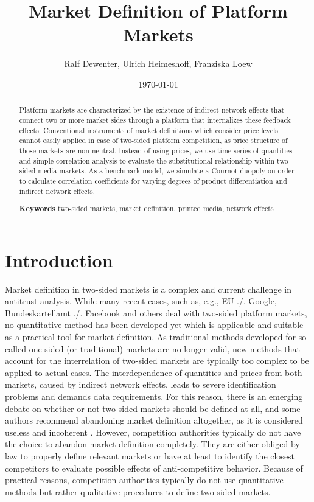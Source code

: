 \documentclass[12pt,a4paper,notitlepage]{article}
\title{Market Definition of Platform Markets}
\date{\today}
\author{Ralf Dewenter, Ulrich Heimeshoff, Franziska Loew}
\begin{document}
\begin{titlepage}
	\maketitle
	\begin{abstract}
		Platform markets are characterized by the existence of indirect network effects that connect two or more market sides through a platform that internalizes these feedback effects. Conventional instruments of market definitions which consider price levels cannot easily applied in case of two-sided platform competition, as price structure of those markets are non-neutral. Instead of using prices, we use time series of quantities and simple correlation analysis to evaluate the substitutional relationship within two-sided media markets. As a benchmark model, we simulate a Cournot duopoly on order to calculate correlation coefficients for varying degrees of product differentiation and indirect network effects.
		
		\textbf{Keywords} two-sided markets, market definition, printed media, network effects

	\end{abstract}

\end{titlepage}
\setcounter{page}{2}

\section{Introduction}

Market definition in two-sided markets is a complex and current challenge in antitrust analysis. While many recent cases, such as, e.g., EU ./. Google, Bundeskartellamt ./. Facebook and others deal with two-sided platform markets, no quantitative method has been developed yet which is applicable and suitable as a practical tool for market definition. As traditional methods developed for so-called one-sided (or traditional) markets are no longer valid, new methods that account for the interrelation of two-sided markets are typically too complex to be applied to actual cases. The interdependence of quantities and prices from both markets, caused by indirect network effects, leads to severe identification problems and demands data requirements. For this reason, there is an emerging debate on whether or not two-sided markets should be defined at all, and some authors recommend abandoning market definition altogether, as it is considered useless and incoherent \citep{noel_analyzing_2005, kaplow_market_2014}. However, competition authorities typically do not have the choice to abandon market definition completely. They are either obliged by law to properly define relevant markets or have at least to identify the closest competitors to evaluate possible effects of anti-competitive behavior. Because of practical reasons, competition authorities typically do not use quantitative methods but rather qualitative procedures to define two-sided markets.   
\end{document}
